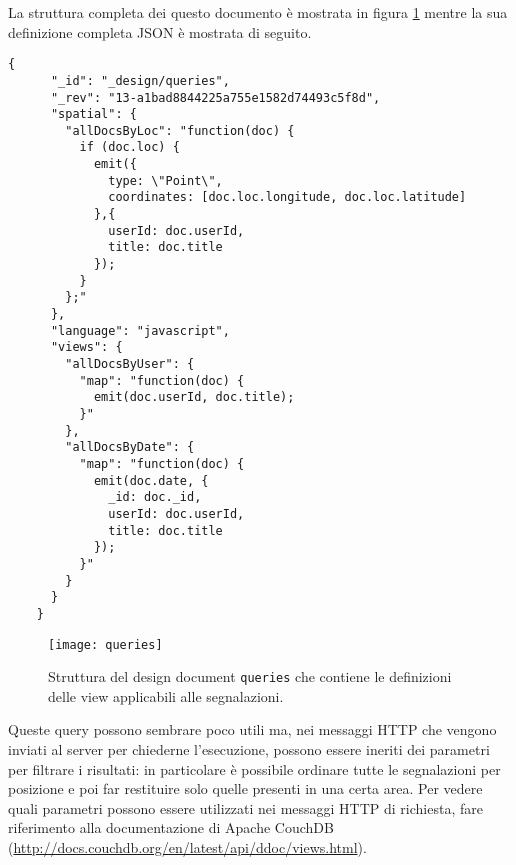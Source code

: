                 La struttura completa dei questo documento è mostrata in 
                figura \ref{fig:queries} mentre la sua definizione completa 
                JSON è mostrata di seguito.
                \begin{lstlisting}[language=plane] 
    {
      "_id": "_design/queries",
      "_rev": "13-a1bad8844225a755e1582d74493c5f8d",
      "spatial": {
        "allDocsByLoc": "function(doc) {
          if (doc.loc) {
            emit({
              type: \"Point\",
              coordinates: [doc.loc.longitude, doc.loc.latitude]
            },{
              userId: doc.userId,
              title: doc.title
            });
          }
        };"
      },
      "language": "javascript",
      "views": {
        "allDocsByUser": {
          "map": "function(doc) {
            emit(doc.userId, doc.title);
          }"
        },
        "allDocsByDate": {
          "map": "function(doc) {
            emit(doc.date, {
              _id: doc._id,
              userId: doc.userId,
              title: doc.title
            });
          }"
        }
      }
    }
                \end{lstlisting}
                \begin{figure}[H]
                    \centering
                    \texttt{[image: queries]}
                    \caption{
                        Struttura del design document \texttt{queries} che 
                        contiene le definizioni delle view applicabili alle 
                        segnalazioni.
                    }
                    \label{fig:queries}
                \end{figure}
                Queste query possono sembrare poco utili ma, nei messaggi HTTP 
                che vengono inviati al server per chiederne l'esecuzione, 
                possono essere ineriti dei parametri per filtrare i risultati: 
                in particolare è possibile ordinare tutte le segnalazioni per 
                posizione e poi far restituire solo quelle presenti in una 
                certa area. Per vedere quali parametri possono essere 
                utilizzati nei messaggi HTTP di richiesta, fare riferimento 
                alla documentazione di Apache CouchDB\texttrademark{} 
                (\url{http://docs.couchdb.org/en/latest/api/ddoc/views.html}).

